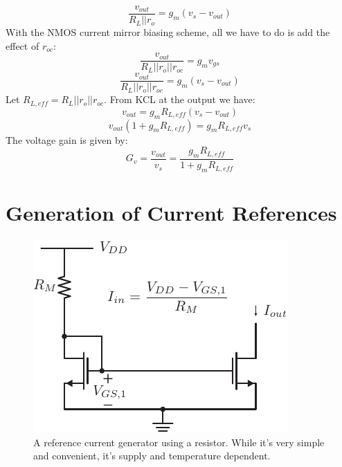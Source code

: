 \begin{equation}
	\frac{{{v_{out}}}}{{{R_L}||{r_o}}} = {g_m}\left( {{v_{s}} - {v_{out}}} \right)
\end{equation}
%
With the NMOS current mirror biasing scheme, all we have to do is add the effect of $r_{oc}$: 
%
\begin{equation}
	\frac{{{v_{out}}}}{{{R_L}||{r_o}||r_{oc}}} = {g_m}{v_{gs}}
\end{equation}
\begin{equation}
	\frac{{{v_{out}}}}{{{R_L}||{r_o}||r_{oc}}} = {g_m}\left( {{v_{s}} - {v_{out}}} \right)
\end{equation}
% 
Let $R_{L,eff} =  R_L || r_o || r_{oc}$.   From KCL at the output we have:
%
\begin{equation}
v_{out} = g_m R_{L,eff} (v_s - v_{out} )
\end{equation}
%
\begin{equation}
v_{out} \left(1 + g_m R_{L,eff} \right) = g_m R_{L,eff} v_s
\end{equation}
%
The voltage gain is given by:
\begin{equation}
G_v = \frac{v_{out}}{v_s} = \frac{ g_m R_{L,eff}}{ 1 + g_m R_{L,eff}}
\end{equation}
 

\section{Generation of Current References} \label{sec:Ireference}


\begin{figure}[tb]
\begin{center}
\includegraphics[scale=1]{mirror_resistor.pdf}
\end{center}
\caption{A reference current generator using a resistor.  While it's very simple and convenient, it's supply and temperature dependent.} \label{fig:iref_gen_rs}
\end{figure}


